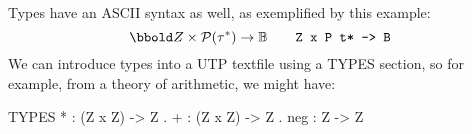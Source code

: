 Types have an ASCII syntax as well,
as exemplified by this example:
\begin{equation*}
 \Int \cross \power (\tau^*) \fun \Bool
 \qquad
 \verb"Z x P t* -> B"
\end{equation*}
We can introduce types into a UTP textfile using a TYPES section,
so for example, from a theory of arithmetic, we might have:
\begin{haskell}
TYPES
 * : (Z x Z) -> Z .
 + : (Z x Z) -> Z .
 neg : Z -> Z
\end{haskell}
